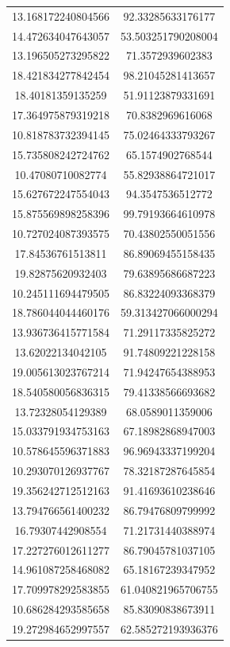 \begin{table}
\begin{tabular}{cc}
13.168172240804566 & 92.33285633176177 \\
14.472634047643057 & 53.503251790208004 \\
13.196505273295822 & 71.3572939602383 \\
18.421834277842454 & 98.21045281413657 \\
18.40181359135259 & 51.91123879331691 \\
17.364975879319218 & 70.8382969616068 \\
10.818783732394145 & 75.02464333793267 \\
15.735808242724762 & 65.1574902768544 \\
10.47080710082774 & 55.82938864721017 \\
15.627672247554043 & 94.3547536512772 \\
15.875569898258396 & 99.79193664610978 \\
10.727024087393575 & 70.43802550051556 \\
17.84536761513811 & 86.89069455158435 \\
19.82875620932403 & 79.63895686687223 \\
10.245111694479505 & 86.83224093368379 \\
18.786044044460176 & 59.313427066000294 \\
13.936736415771584 & 71.29117335825272 \\
13.62022134042105 & 91.74809221228158 \\
19.005613023767214 & 71.94247654388953 \\
18.540580056836315 & 79.41338566693682 \\
13.72328054129389 & 68.0589011359006 \\
15.033791934753163 & 67.18982868947003 \\
10.578645596371883 & 96.96943337199204 \\
10.293070126937767 & 78.32187287645854 \\
19.356242712512163 & 91.41693610238646 \\
13.794766561400232 & 86.79476809799992 \\
16.79307442908554 & 71.21731440388974 \\
17.227276012611277 & 86.79045781037105 \\
14.961087258468082 & 65.18167239347952 \\
17.709978292583855 & 61.040821965706755 \\
10.686284293585658 & 85.83090838673911 \\
19.272984652997557 & 62.585272193936376 \\

\end{tabular}
\end{table}
